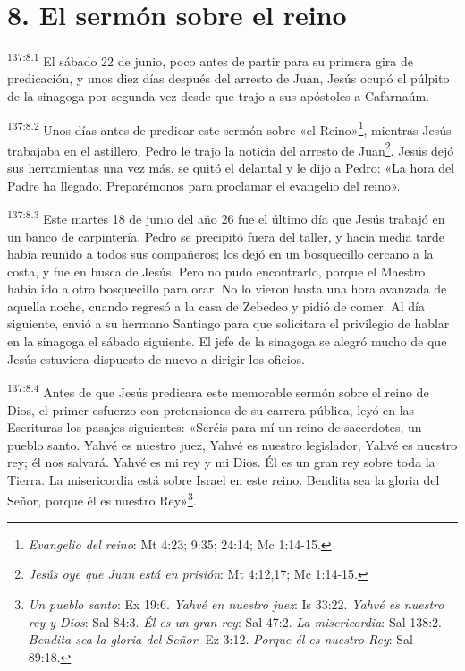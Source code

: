 \section*{8. El sermón sobre el reino}
\par 
\textsuperscript{137:8.1} El sábado 22 de junio, poco antes de partir para su primera gira de predicación, y unos diez días después del arresto de Juan, Jesús ocupó el púlpito de la sinagoga por segunda vez desde que trajo a sus apóstoles a Cafarnaúm.

\par 
\textsuperscript{137:8.2} Unos días antes de predicar este sermón sobre «el Reino»\footnote{\textit{Evangelio del reino}: Mt 4:23; 9:35; 24:14; Mc 1:14-15.}, mientras Jesús trabajaba en el astillero, Pedro le trajo la noticia del arresto de Juan\footnote{\textit{Jesús oye que Juan está en prisión}: Mt 4:12,17; Mc 1:14-15.}. Jesús dejó sus herramientas una vez más, se quitó el delantal y le dijo a Pedro: «La hora del Padre ha llegado. Preparémonos para proclamar el evangelio del reino».

\par 
\textsuperscript{137:8.3} Este martes 18 de junio del año 26 fue el último día que Jesús trabajó en un banco de carpintería. Pedro se precipitó fuera del taller, y hacia media tarde había reunido a todos sus compañeros; los dejó en un bosquecillo cercano a la costa, y fue en busca de Jesús. Pero no pudo encontrarlo, porque el Maestro había ido a otro bosquecillo para orar. No lo vieron hasta una hora avanzada de aquella noche, cuando regresó a la casa de Zebedeo y pidió de comer. Al día siguiente, envió a su hermano Santiago para que solicitara el privilegio de hablar en la sinagoga el sábado siguiente. El jefe de la sinagoga se alegró mucho de que Jesús estuviera dispuesto de nuevo a dirigir los oficios.

\par 
\textsuperscript{137:8.4} Antes de que Jesús predicara este memorable sermón sobre el reino de Dios, el primer esfuerzo con pretensiones de su carrera pública, leyó en las Escrituras los pasajes siguientes: «Seréis para mí un reino de sacerdotes, un pueblo santo. Yahvé es nuestro juez, Yahvé es nuestro legislador, Yahvé es nuestro rey; él nos salvará. Yahvé es mi rey y mi Dios. Él es un gran rey sobre toda la Tierra. La misericordia está sobre Israel en este reino. Bendita sea la gloria del Señor, porque él es nuestro Rey»\footnote{\textit{Un pueblo santo}: Ex 19:6. \textit{Yahvé en nuestro juez}: Is 33:22. \textit{Yahvé es nuestro rey y Dios}: Sal 84:3. \textit{Él es un gran rey}: Sal 47:2. \textit{La misericordia}: Sal 138:2. \textit{Bendita sea la gloria del Señor}: Ez 3:12. \textit{Porque él es nuestro Rey}: Sal 89:18.}.

